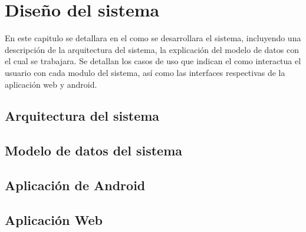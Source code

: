 \chapter{Diseño del sistema}
%

En este capitulo se detallara en el como se desarrollara el sistema, incluyendo una descripción de la arquitectura del sistema, la explicación del modelo de datos con el cual se trabajara. Se detallan los casos de uso que indican el como interactua el usuario con cada modulo del sistema, así como las interfaces respectivas de la aplicación web y android.
\section{Arquitectura del sistema}

\section{Modelo de datos del sistema}

\section{Aplicación de Android}

\newpage
\section{Aplicación Web}

\newpage

\newpage

